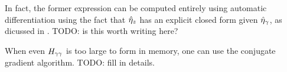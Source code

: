 In fact, the former expression can be computed entirely using automatic
differentiation using the fact that $\hat\eta_{z}$ has an explicit closed form given
$\hat\eta_{\gamma}$, as dicussed in .  TODO: is this worth writing
here?

When even $H_{\gamma\gamma}$ is too large to form in memory, one can
use the conjugate gradient algorithm.  TODO: fill in details.



%
%
%
%
%
